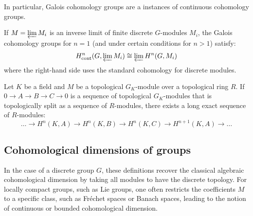 In particular, Galois cohomology groups are a instances of continuous cohomology groups.




\begin{proposition}
If $M = \varprojlim M_i$ is an inverse limit of finite discrete $G$-modules $M_i$, the Galois cohomology groups for $n=1$ (and under certain conditions for $n > 1$) satisfy:
$$H^n_{\text{cont}}(G, \varprojlim M_i) \cong \varprojlim H^n(G, M_i)$$
where the right-hand side uses the standard cohomology for discrete modules.
\end{proposition}

\begin{theorem}
    \TODO{}
Let $K$ be a field and $M$ be a topological $G_K$-module over a topological ring $R$. If $0 \to A \to B \to C \to 0$ is a sequence of topological $G_K$-modules that is topologically split as a sequence of $R$-modules, there exists a long exact sequence of $R$-modules:
$$\dots \to H^n(K, A) \to H^n(K, B) \to H^n(K, C) \to H^{n+1}(K, A) \to \dots$$
\end{theorem}


\subsection{Cohomological dimensions of groups}












\begin{remark}
In the case of a discrete group $G$, these definitions recover the classical algebraic cohomological dimension by taking all modules to have the discrete topology. For locally compact groups, such as Lie groups, one often restricts the coefficients $M$ to a specific class, such as Fréchet spaces or Banach spaces, leading to the notion of continuous or bounded cohomological dimension.
\end{remark}



